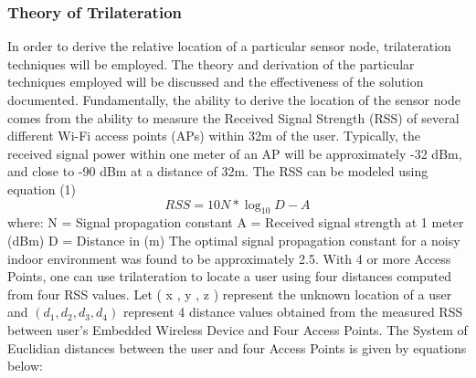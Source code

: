 \documentclass[conference]{IEEEtran}
\begin{document}
\subsubsection{Theory of Trilateration}
In order to derive the relative location of a particular sensor node, trilateration techniques will be employed. The theory and derivation of the particular techniques employed will be discussed and the effectiveness of the solution documented. Fundamentally, the ability to derive the location of the sensor node comes from the ability to measure  the  Received  Signal  Strength (RSS) of  several  different  Wi-Fi  access  points (APs)  within  32m  of  the  user.    Typically,  the  received  signal  power  within  one  meter  of  an  AP  will  be  approximately  -32  dBm,  and  close  to  -90  dBm  at  a  distance  of  32m. The RSS can be  modeled using  equation  (1)  
\begin{equation}
RSS = 10N*\log_{10}D-A  
\end{equation}
where: 
\newline
N = Signal propagation constant
\newline
A = Received signal strength at 1 meter (dBm)
\newline
D = Distance in (m)
\newline
\newline
The optimal signal propagation constant for a noisy indoor environment was found to be approximately 2.5. With  4 or more  Access Points,  one  can  use  trilateration  to  locate  a  user  using  four  distances  computed  from  four  RSS  values.    Let  ( x , y , z )  represent  the  unknown  location  of  a  user  and $(d_1,  d_2,  d_3,  d_4)$ represent 4 distance values obtained from the measured RSS between user's Embedded Wireless Device and Four Access Points. The System of Euclidian  distances  between  the  user  and  four  Access Points  is  given  by  equations below:
\end{document}
